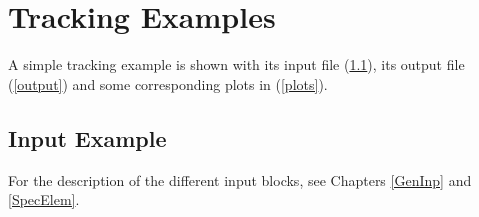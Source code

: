 
\chapter{Tracking Examples} \label{Exam}

A simple tracking example is shown with its input file (\ref{input}), its output file (\ref{output}) and some corresponding plots in (\ref{plots}).

\section{Input Example} \label{input}

For the description of the different input blocks, see Chapters \ref{GenInp} and \ref{SpecElem}.

